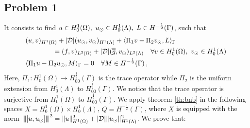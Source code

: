 \subsection{Problem 1}
It consists to find $u \in H^1_0(\Omega),\ \ud \in H_0^1(\Lambda), \ L \in H^{-\frac12}(\Gamma )$, such that
\begin{subequations}\label{eq:red_dirneu}
\begin{align}
&(u,v)_{H^1(\Omega)} + |{\cal D}| (\ud,\vd)_{H^1(\Lambda)} 
+ \langle \Pi_1 v  - \Pi_2 \vd, L \rangle_\Gamma 
\\
\nonumber
&\qquad\qquad= (f,v)_{L^2(\Omega)} + |{\cal D}|(\avrd{g},\vd)_{L^2(\Lambda)}
\quad \forall v \in H^1_0(\Omega), \ \vd \in H^1_0(\Lambda)
\\
&   \langle \Pi_1 u - \Pi_2 \ud , M \rangle_\Gamma = 0
\quad \forall M \in H^{-\frac12}(\Gamma)\,,
\end{align}
\end{subequations}
Here, $\Pi_1: H^1_0(\Omega) \rightarrow H^{\frac12}_{00}(\Gamma)$ is the trace operator 
while $\Pi_2$ is the uniform extension from $H^1_0(\Lambda)$ to  $H^{\frac12}_{00}(\Gamma)$. 
We notice that the trace operator is surjective from $H^1_0(\Omega)$ to $H^{\frac12}_{00}(\Gamma)$.
We apply theorem \ref{th:bnb} in the following spaces 
$X=H^1_0(\Omega) \times H^1_0(\Lambda)$, $Q=H^{-\frac 12}(\Gamma)$, where $X$  is equipped with the norm ${\left\vert\kern-0.25ex\left\vert\kern-0.25ex\left\vert [u,u_{\odot} ] \right\vert\kern-0.25ex\right\vert\kern-0.25ex\right\vert}^2=\|u\|^2_{H^1(\Omega)} + |\mathcal{D}|\|u_{\odot}\|^2_{H^1(\Lambda)}$. We prove that:
